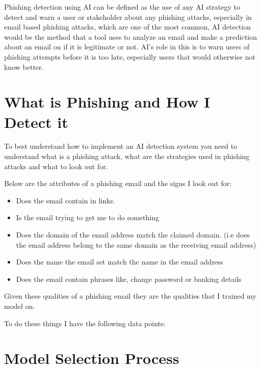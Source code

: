 \documentclass[a4paper,10pt]{article}
\begin{document}
Phishing detection using AI can be defined as the use of any AI strategy to
detect and warn a user or stakeholder about any phishing attacks, especially in
email based phishing attacks, which are one of the most common, AI detection
would be the method that a tool uses to analyze an email and make a prediction
about an email on if it is legitimate or not. AI's role in this is to warn users
of phishing attempts before it is too late, especially users that would
otherwise not know better.


\pagebreak
\section{What is Phishing and How I Detect it}

To best understand how to implement an AI detection system you need to
understand what is a phishing attack, what are the strategies used in phishing
attacks and what to look out for. \par

Below are the attributes of a phishing email and the signs I look out for:

\begin{itemize}
	\item Does the email contain in links.
	\item Is the email trying to get me to do something
	\item Does the domain of the email address match the claimed domain. (i.e does
	      the email address belong to the same domain as the receiving email address)
	\item Does the name the email set match the name in the email address
	\item Does the email contain phrases like, change password or banking details
\end{itemize}

Given these qualities of a phishing email they are the qualities that I trained
my model on. \par

To do these things I have the following data points:

\section{Model Selection Process}
\end{document}
